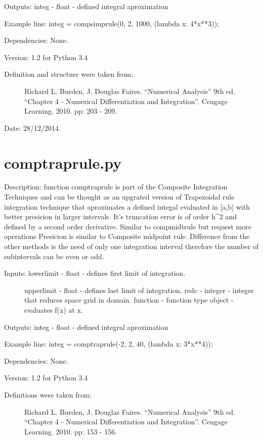 \documentclass[letterpaper,10pt,oneside]{sphinxmanual}
\theoremstyle{plain}%
\theoremstyle{definition}%
\theoremstyle{remark}%
\begin{document}
Outputs: integ - float - defined integral aproximation

Example line: integ = compsimprule(0, 2, 1000, (lambda x: 4*x**3));

Dependencies: None.

Version: 1.2 for Python 3.4
\begin{description}
\item[{Definition and structure were taken from:}] \leavevmode
Richard L. Burden, J. Douglas Faires. ``Numerical Analysis'' 9th ed.
``Chapter 4 - Numerical Differentiation and Integration''. 
Cengage Learning. 2010. pp: 203 - 209.

\end{description}


Date: 28/12/2014.


\section{comptraprule.py}
\label{code:module-comptraprule}\label{code:comptraprule-py}
Description: function comptraprule is part of the Composite Integration
Techniques and can be thought as an upgrated version of Trapezoidal rule
integration technique that aproximates a defined integal evaluated in {[}a,b{]}
with better presicion in larger intervals. It's truncation error is of order
h\textasciicircum{}2 and defined by a second order derivative. Similar to compmidtrule but
request more operations Presicion is similar to Composite midpoint rule.
Difference from the other methods is the need of only one integration interval
therefore the number of subintervals can be even or odd.
\begin{description}
\item[{Inputs: lowerlimit - float - defines first limit of integration.}] \leavevmode
upperlimit - float - defines last limit of integration.
redc - integer - integer that reduces space grid in domain.
function - function type object - evaluates f(x) at x.

\end{description}

Outputs: integ - float - defined integral aproximation

Example line: integ = comptraprule(-2, 2, 40, (lambda x: 3*x**4));

Dependencies: None.

Version: 1.2 for Python 3.4
\begin{description}
\item[{Definitions were taken from:}] \leavevmode
Richard L. Burden, J. Douglas Faires. ``Numerical Analysis'' 9th ed.
``Chapter 4 - Numerical Differentiation and Integration''. 
Cengage Learning. 2010. pp: 153 - 156.

\end{description}
\end{document}
